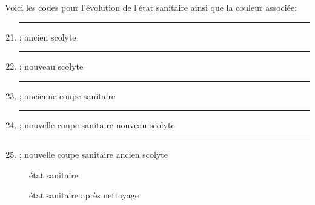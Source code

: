 \documentclass[a4paper, 12pt]{article} %
\newcommand\crule[3][black]{\textcolor{#1}{\rule{#2}{#3}}}
\begin{document}
Voici les codes pour l'évolution de l'état sanitaire ainsi que la couleur associée:
\begin{enumerate}\setcounter{enumi}{20}
	\item \crule[cl21]{1cm}{1cm} ; ancien scolyte
	\item \crule[cl22]{1cm}{1cm} ; nouveau scolyte
	\setcounter{enumi}{40}
	\item \crule[cl41]{1cm}{1cm} ; ancienne coupe sanitaire
	\item \crule[cl42]{1cm}{1cm} ; nouvelle coupe sanitaire nouveau scolyte
	\item \crule[cl43]{1cm}{1cm} ; nouvelle coupe sanitaire ancien scolyte
\end{enumerate} 


\begin{figure}
\begin{minipage}[b]{.49\linewidth}
	\centering état sanitaire
\end{minipage}%
\begin{minipage}[b]{.49\linewidth}
	\centering état sanitaire après nettoyage

\end{minipage}
\end{figure}
\end{document}
